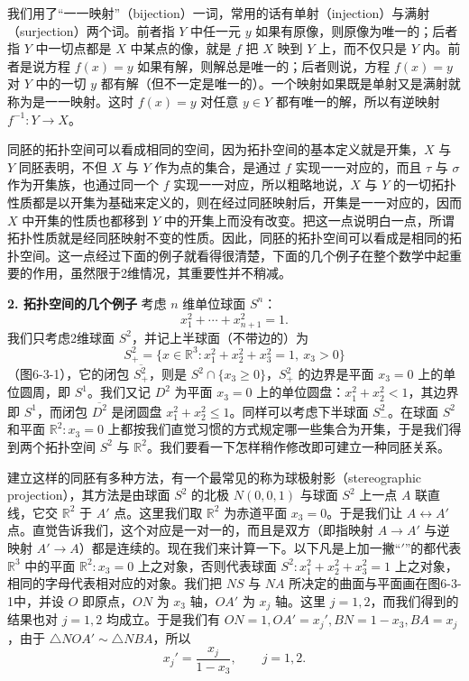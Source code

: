 我们用了“一一映射”（bijection）一词，常用的话有单射（injection）与满射（surjection）两个词。前者指 $Y$ 中任一元 $y$ 如果有原像，则原像为唯一的；后者指 $Y$ 中一切点都是 $X$ 中某点的像，就是 $f$ 把 $X$ 映到 $Y$ 上，而不仅只是 $Y$ 内。前者是说方程 $f(x)=y$ 如果有解，则解总是唯一的；后者则说，方程 $f(x)=y$ 对 $Y$ 中的一切 $y$ 都有解（但不一定是唯一的）。一个映射如果既是单射又是满射就称为是一一映射。这时 $f(x)=y$ 对任意 $y\in Y$ 都有唯一的解，所以有逆映射 $f^{-1}:Y\to X$。

同胚的拓扑空间可以看成相同的空间，因为拓扑空间的基本定义就是开集，$X$ 与 $Y$ 同胚表明，不但 $X$ 与 $Y$ 作为点的集合，是通过 $f$ 实现一一对应的，而且 $\tau$ 与 $\sigma$ 作为开集族，也通过同一个 $f$ 实现一一对应，所以粗略地说，$X$ 与 $Y$ 的一切拓扑性质都是以开集为基础来定义的，则在经过同胚映射后，开集是一一对应的，因而 $X$ 中开集的性质也都移到 $Y$ 中的开集上而没有改变。把这一点说明白一点，所谓拓扑性质就是经同胚映射不变的性质。因此，同胚的拓扑空间可以看成是相同的拓扑空间。这一点经过下面的例子就看得很清楚，下面的几个例子在整个数学中起重要的作用，虽然限于2维情况，其重要性并不稍减。

\noindent\textbf{2. 拓扑空间的几个例子}\quad
考虑 $n$ 维单位球面 $S^n$：
\[
 x_1^2+\cdots+x_{n+1}^2=1.
\]
我们只考虑2维球面 $S^2$，并记上半球面（不带边的）为
\[
 S_+^2=\{x\in\mathbb R^3:x_1^2+x_2^2+x_3^2=1,\ x_3>0\}
\]
（图6-3-1），它的闭包 $\overline{S_+^2}$，则是 $S^2\cap\{x_3\ge0\}$，$S_+^2$ 的边界是平面 $x_3=0$ 上的单位圆周，即 $S^1$。我们又记 $D^2$ 为平面 $x_3=0$ 上的单位圆盘：$x_1^2+x_2^2<1$，其边界即 $S^1$，而闭包 $\overline{D^2}$ 是闭圆盘 $x_1^2+x_2^2\le1$。同样可以考虑下半球面 $S_-^2$。在球面 $S^2$ 和平面 $\mathbb R^2:x_3=0$ 上都按我们直觉习惯的方式规定哪一些集合为开集，于是我们得到两个拓扑空间 $S^2$ 与 $\mathbb R^2$。我们要看一下怎样稍作修改即可建立一种同胚关系。

建立这样的同胚有多种方法，有一个最常见的称为球极射影（stereographic projection），其方法是由球面 $S^2$ 的北极 $N(0,0,1)$ 与球面 $S^2$ 上一点 $A$ 联直线，它交 $\mathbb R^2$ 于 $A'$ 点。这里我们取 $\mathbb R^2$ 为赤道平面 $x_3=0$。于是我们让 $A\leftrightarrow A'$ 点。直觉告诉我们，这个对应是一对一的，而且是双方（即指映射 $A\to A'$ 与逆映射 $A'\to A$）都是连续的。现在我们来计算一下。以下凡是上加一撇“$'$”的都代表 $\mathbb R^3$ 中的平面 $\mathbb R^2:x_3=0$ 上之对象，否则代表球面 $S^2:x_1^2+x_2^2+x_3^2=1$ 上之对象，相同的字母代表相对应的对象。我们把 $NS$ 与 $NA$ 所决定的曲面与平面画在图6-3-1中，并设 $O$ 即原点，$ON$ 为 $x_3$ 轴，$OA'$ 为 $x_j$ 轴。这里 $j=1,2$，而我们得到的结果也对 $j=1,2$ 均成立。于是我们有 $ON=1,OA'=x_j',BN=1-x_3,BA=x_j$，由于 $\triangle NOA'\sim\triangle NBA$，所以
\begin{equation}
 x_j'=\frac{x_j}{1-x_3},\qquad j=1,2.
 \tag{2}
\end{equation}

